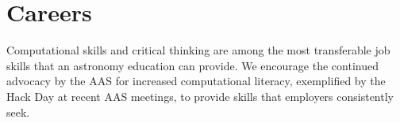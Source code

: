 \documentclass[11pt]{article}
\begin{document}
\section{Careers}

Computational skills and critical thinking are among the most
transferable job skills that an astronomy education can provide.
We encourage the continued advocacy by the AAS for increased
computational literacy, exemplified by the Hack Day at recent AAS meetings, 
to provide skills that employers consistently seek.


\end{document}
